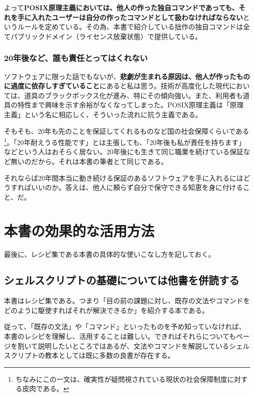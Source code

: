 よって\textbf{POSIX原理主義においては、他人の作った独自コマンドであっても、それを手に入れたユーザーは自分の作ったコマンドとして扱わなければならない}というルールを定めている。その為、本書で紹介している拙作の独自コマンドは全てパブリックドメイン（ライセンス放棄状態）で提供している。

\subsubsection*{20年後など、誰も責任とってはくれない}

ソフトウェアに限った話でもないが、\textbf{悲劇が生まれる原因は、他人が作ったものに過度に依存しすぎていること}にあると私は思う。技術が高度化した現代においては、道具のブラックボックス化が進み、特にその傾向強い。また、利用者も道具の特性まで興味を示す余裕がなくなってしまった。POSIX原理主義は「原理主義」という名に相応しく、そういった流れに抗う主義である。

そもそも、20年も先のことを保証してくれるものなど国の社会保障くらいである\footnote{ちなみにこの一文は、確実性が疑問視されている現状の社会保障制度に対する皮肉である。}。「20年耐えうる性能です」とは主張しても、「20年後も私が責任を持ちます」などという人はおそらく居ない。20年後にも生きて同じ職業を続けている保証など無いのだから。それは本書の筆者とて同じである。

それならば20年間本当に動き続ける保証のあるソフトウェアを手に入れるにはどうすればいいのか。答えは、他人に頼らず自分で保守できる知恵を身に付けること、だ。


\section*{本書の効果的な活用方法}

最後に、レシピ集である本書の具体的な使いこなし方を記しておく。

\subsection*{シェルスクリプトの基礎については他書を併読する}

本書はレシピ集である。つまり「目の前の課題に対し、既存の文法やコマンドをどのように駆使すればそれが解決できるか」を紹介する本である。

従って、「既存の文法」や「コマンド」といったものを予め知っていなければ、本書のレシピを理解し、活用することは難しい。できればそれらについてもページを割いて説明したいところではあるが、文法やコマンドを解説しているシェルスクリプトの教本としては既に多数の良書が存在する。

